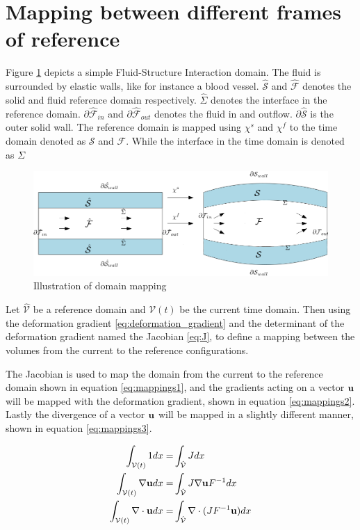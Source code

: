 \section{Mapping between different frames of reference}
Figure \ref{pic:FSI_mapping} depicts a simple Fluid-Structure Interaction domain. The fluid is surrounded by elastic walls, like for instance a blood vessel. 
$\hat{\mathcal{S}}$ and $\hat{\mathcal{F}}$ denotes the solid and fluid reference domain respectively. $\hat{\Sigma}$ denotes the interface in the reference domain. $\partial\hat{\mathcal{F}}_{in}$ and $\partial\hat{\mathcal{F}}_{out}$ denotes the fluid in and outflow. $\partial \hat{\mathcal{S}}$ is the outer solid wall. The reference domain is mapped using $\chi^s$ and $\chi^f$ to the time domain denoted as $\mathcal{S}$ and $\mathcal{F}$. While the interface in the time domain is denoted as $\Sigma$

\begin{figure}[H]
\label{pic:FSI_mapping}
\includegraphics[scale=0.45]{./FSI_ALE_formulation/FSI_mapping.png}
\caption{Illustration of domain mapping}
\end{figure}

Let $\hat{\mathcal{V}}$ be a reference domain and $\mathcal{V}(t)$ be the current time domain. Then using the deformation gradient \eqref{eq:deformation_gradient} and the determinant of the deformation gradient named the Jacobian \eqref{eq:J}, to define a mapping between the volumes from the current to the reference configurations.

The Jacobian is used to map the domain from the current to the reference domain shown in equation \ref{eq:mappings1}, and the gradients acting on a vector $ \bold{u} $ will be mapped with the deformation gradient, shown in equation \ref{eq:mappings2}. Lastly the divergence of a vector $ \bold{u}$ will be mapped in a slightly different manner, shown in equation \ref{eq:mappings3}.

\begin{align}
\int_{\mathcal{V}(t)} 1  dx =& \int_{\hat{\mathcal{V}}} J dx  \label{eq:mappings1}\\
\int_{\mathcal{V}(t)} \nabla \bold{u}   dx =& \int_{\hat{\mathcal{V}}} J  \nabla \bold{u}F^{-1} dx \label{eq:mappings2} \\
\int_{\mathcal{V}(t)} \nabla \cdot \bold{u}   dx =& \int_{\hat{\mathcal{V}}} \nabla \cdot( J  F^{-1} \bold{u}) dx  \label{eq:mappings3}
\end{align}

